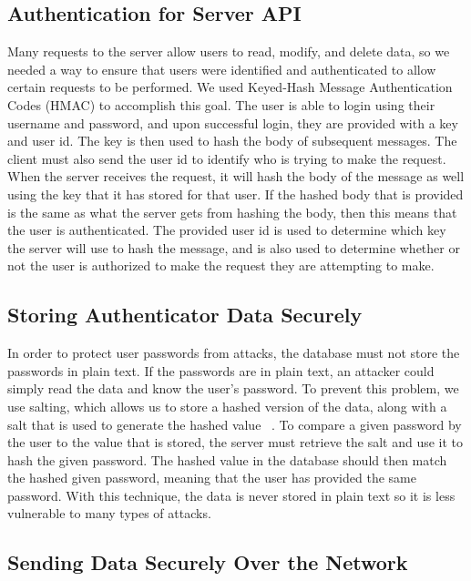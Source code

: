 \documentclass[12pt]{report}
\let\Oldsubsection\subsection
\renewcommand{\subsection}{\FloatBarrier\Oldsubsection}
\begin{document}
\subsection{Authentication for Server API} \label{authentication-for-server-api}

Many requests to the server allow users to read, modify, and delete data, so we needed a
way to ensure that users were identified and authenticated to allow certain requests to be
performed. We used Keyed-Hash Message Authentication Codes (HMAC) to accomplish this goal.
The user is able to login using their username and password, and upon successful login, they are
provided with a key and user id. The key is then used to hash the body of subsequent messages. 
The client must also send the user id to identify who is trying to
make the request. When the server receives the request, it will hash the body of the message as
well using the key that it has stored for that user. If the hashed body that is provided is the same
as what the server gets from hashing the body, then this means that the user is authenticated. The
provided user id is used to determine which key the server will use to hash the message, and is
also used to determine whether or not the user is authorized to make the request they are
attempting to make.

\subsection{Storing Authenticator Data Securely} \label{storing-authenticator-data-securely}

In order to protect user passwords from attacks, the database must not store the
passwords in plain text. If the passwords are in plain text, an attacker could simply read the data
and know the user’s password. To prevent this problem, we use salting, which allows us to store a 
hashed version of the data, along with a salt that is
used to generate the hashed value ~\autocite{PASSWORDSALTING}. To compare a given password by the user to the value that is
stored, the server must retrieve the salt and use it to hash the given password. The hashed value
in the database should then match the hashed given password, meaning that the user has provided
the same password. With this technique, the data is never stored in plain text so it is less
vulnerable to many types of attacks.

\subsection{Sending Data Securely Over the Network} \label{sending-data-securely-over-the-network}
\end{document}
